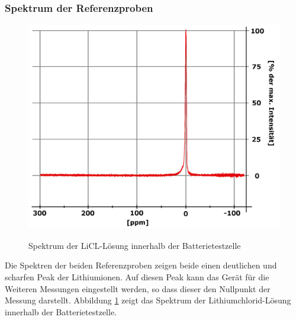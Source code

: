 \documentclass[a4paper, 11pt, headsepline,footsepline,twoside,abstract]{scrbook}
\begin{document}
\subsubsection{Spektrum der Referenzproben}
\begin{figure}
	\centering
	\includegraphics[width=0.75\columnwidth]{images/LiCl_Batterie.jpg}
	\label{LiCl_Batterie_NMR} 
	\caption{Spektrum der LiCL-Lösung innerhalb der Batterietestzelle}
	\label{LiCl_Batterie_NMR}
\end{figure} 
Die Spektren der beiden Referenzproben zeigen beide einen deutlichen und scharfen Peak der Lithiumionen. Auf diesen Peak kann das Gerät für die Weiteren Messungen eingestellt werden, so dass dieser den Nullpunkt der Messung darstellt. Abbildung \ref{LiCl_Batterie_NMR} zeigt das Spektrum der Lithiumchlorid-Lösung innerhalb der Batterietestzelle.
\end{document}
